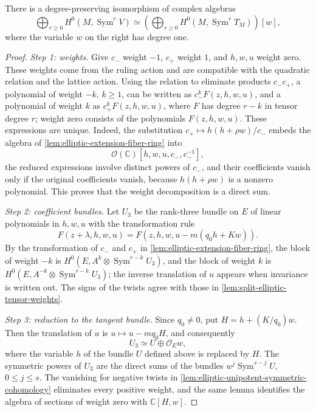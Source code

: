 \begin{theorem}\label{thm:elliptic-extension-polynomial-ring}
There is a degree-preserving isomorphism of complex algebras
\[
 \bigoplus_{r\geq0}H^0(M,\operatorname{Sym}^rV)
 \simeq
 \left(\bigoplus_{r\geq0}H^0(M,\operatorname{Sym}^rT_M)\right)[w],
\]
where the variable $w$ on the right has degree one.
\end{theorem}
\begin{proof}
\emph{Step 1: weights.} Give $c_-$ weight $-1$, $c_+$ weight $1$, and $h,w,u$ weight zero. These weights come from the ruling action and are compatible with the quadratic relation and the lattice action. Using the relation to eliminate products $c_-c_+$, a polynomial of weight $-k$, $k\geq1$, can be written as $c_-^kF(z,h,w,u)$, and a polynomial of weight $k$ as $c_+^kF(z,h,w,u)$, where $F$ has degree $r-k$ in tensor degree $r$; weight zero consists of the polynomials $F(z,h,w,u)$. These expressions are unique. Indeed, the substitution $c_+\mapsto h(h+\rho w)/c_-$ embeds the algebra of \cref{lem:elliptic-extension-fiber-ring} into
\[
 \mathcal O(\mathbb C)[h,w,u,c_-,c_-^{-1}],
\]
the reduced expressions involve distinct powers of $c_-$, and their coefficients vanish only if the original coefficients vanish, because $h(h+\rho w)$ is a nonzero polynomial. This proves that the weight decomposition is a direct sum.

\emph{Step 2: coefficient bundles.} Let $U_3$ be the rank-three bundle on $E$ of linear polynomials in $h,w,u$ with the transformation rule
\[
 F(z+\lambda,h,w,u)
       =F(z,h,w,u-m(q_0h+Kw)).
\]
By the transformation of $c_-$ and $c_+$ in \cref{lem:elliptic-extension-fiber-ring}, the block of weight $-k$ is $H^0(E,A^k\otimes\operatorname{Sym}^{r-k}U_3)$, and the block of weight $k$ is $H^0(E,A^{-k}\otimes\operatorname{Sym}^{r-k}U_3)$; the inverse translation of $u$ appears when invariance is written out. The signs of the twists agree with those in \cref{lem:split-elliptic-tensor-weights}.

\emph{Step 3: reduction to the tangent bundle.} Since $q_0\ne0$, put $H=h+(K/q_0)w$. Then the translation of $u$ is $u\mapsto u-mq_0H$, and consequently
\[
 U_3\simeq U\oplus\mathcal O_Ew,
\]
where the variable $h$ of the bundle $U$ defined above is replaced by $H$. The symmetric powers of $U_3$ are the direct sums of the bundles $w^j\operatorname{Sym}^{s-j}U$, $0\leq j\leq s$. The vanishing for negative twists in \cref{lem:elliptic-unipotent-symmetric-cohomology} eliminates every positive weight, and the same lemma identifies the algebra of sections of weight zero with $\mathbb C[H,w]$.


\end{proof}
